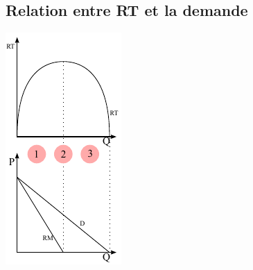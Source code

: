 \subsection{Relation entre RT et la demande}


\begin{minipage}{0.3\textwidth}
    \includegraphics[width=\textwidth]{images/graph_relation_entre_rt_et_demande.pdf}
\end{minipage}

